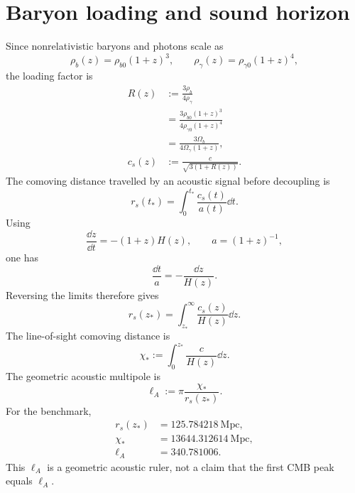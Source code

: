 \section{Baryon loading and sound horizon}
Since nonrelativistic baryons and photons scale as
\begin{equation}
\rho_b(z)=\rho_{b0}(1+z)^3,
\qquad
\rho_\gamma(z)=\rho_{\gamma0}(1+z)^4,
\end{equation}
the loading factor is
\begin{align}
R(z)
&:=\frac{3\rho_b}{4\rho_\gamma}\\
&=\frac{3\rho_{b0}(1+z)^3}
{4\rho_{\gamma0}(1+z)^4}\\
&=\frac{3\Omega_b}{4\Omega_\gamma(1+z)},\\
c_s(z)&:=\frac{c}{\sqrt{3(1+R(z))}}.
\end{align}
The comoving distance travelled by an acoustic signal before decoupling is
\begin{equation}
r_s(t_*)=\int_0^{t_*}\frac{c_s(t)}{a(t)}\dd t.
\end{equation}
Using
\begin{equation}
\frac{\dd z}{\dd t}=-(1+z)H(z),
\qquad
a=(1+z)^{-1},
\end{equation}
one has
\begin{equation}
\frac{\dd t}{a}=-\frac{\dd z}{H(z)}.
\end{equation}
Reversing the limits therefore gives
\begin{equation}
\boxed{
r_s(z_*)
=\int_{z_*}^{\infty}\frac{c_s(z)}{H(z)}\dd z.
}
\end{equation}
The line-of-sight comoving distance is
\begin{equation}
\chi_*:=\int_0^{z_*}\frac{c}{H(z)}\dd z.
\end{equation}
The geometric acoustic multipole is
\begin{equation}
\boxed{
\ell_A:=\pi\frac{\chi_*}{r_s(z_*)}.
}
\end{equation}
For the benchmark,
\begin{align}
r_s(z_*)&=125.784218\ \mathrm{Mpc},\\
\chi_*&=13644.312614\ \mathrm{Mpc},\\
\ell_A&=340.781006.
\end{align}
This \(\ell_A\) is a geometric acoustic ruler, not a claim that the first CMB peak equals \(\ell_A\).

